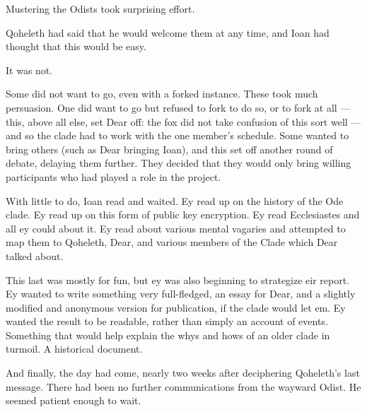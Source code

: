 Mustering the Odists took surprising effort.

Qoheleth had said that he would welcome them at any time, and Ioan had thought that this would be easy.

It was not.

Some did not want to go, even with a forked instance. These took much persuasion. One did want to go but refused to fork to do so, or to fork at all --- this, above all else, set Dear off: the fox did not take confusion of this sort well --- and so the clade had to work with the one member's schedule. Some wanted to bring others (such as Dear bringing Ioan), and this set off another round of debate, delaying them further. They decided that they would only bring willing participants who had played a role in the project.

With little to do, Ioan read and waited. Ey read up on the history of the Ode clade. Ey read up on this form of public key encryption. Ey read Ecclesiastes and all ey could about it. Ey read about various mental vagaries and attempted to map them to Qoheleth, Dear, and various members of the Clade which Dear talked about.

This last was mostly for fun, but ey was also beginning to strategize eir report. Ey wanted to write something very full-fledged, an essay for Dear, and a slightly modified and anonymous version for publication, if the clade would let em. Ey wanted the result to be readable, rather than simply an account of events. Something that would help explain the whys and hows of an older clade in turmoil. A historical document.

And finally, the day had come, nearly two weeks after deciphering Qoheleth's last message. There had been no further communications from the wayward Odist. He seemed patient enough to wait.
